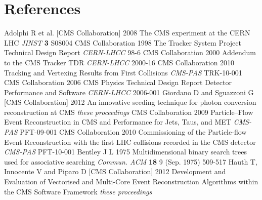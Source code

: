\section*{References}

\begin{thebibliography}{99}
  Adolphi R et al. [CMS Collaboration] 2008 The CMS experiment at the CERN LHC
  {\em JINST} {\bf 3} S08004 
 CMS Collaboration 1998 The Tracker System Project Technical Design Report
  {\em CERN-LHCC} 98-6
 CMS Collaboration 2000 Addendum to the CMS Tracker TDR {\em
   CERN-LHCC} 2000-16
 CMS Collaboration 2010 Tracking and Vertexing Results from First Collisions
{\em CMS-PAS} TRK-10-001
 CMS Collaboration 2006 CMS Physics Technical Design
    Report Detector Performance and Software {\em
      CERN-LHCC} 2006-001
 Giordano D and Sguazzoni G [CMS
  Collaboration] 2012 An innovative seeding technique for photon conversion
  reconstruction at CMS {\em these proceedings}
 CMS Collaboration 2009 Particle--Flow Event
  Reconstruction in CMS and Performance for Jets, Taus, and MET {\em CMS-PAS} PFT-09-001
 CMS Collaboration 2010 Commissioning of the
  Particle-flow Event Reconstruction with the first LHC collisions
  recorded in the CMS detector {\em CMS-PAS} PFT-10-001
 Bentley J L 1975 Multidimensional binary search
    trees used for associative searching {\em Commun. ACM} {\bf 18} 9 (Sep. 1975) 509-517 
 Hauth T, Innocente V and Piparo D [CMS
  Collaboration] 2012 Development and Evaluation of Vectorised and
    Multi-Core Event Reconstruction Algorithms within the CMS Software
    Framework {\em these proceedings}
\end{thebibliography}
